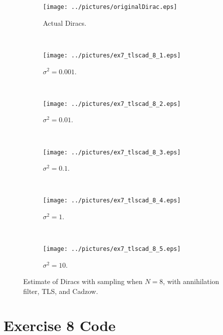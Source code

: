 \documentclass[11pt,a4paper]{report}
\begin{document}
\begin{figure}[H]
    \captionsetup[subfigure]{position=b}
    \centering
    \begin{subfigure}{0.49\textwidth}
        \texttt{[image: ../pictures/originalDirac.eps]}
        \caption{Actual Diracs.}
        \label{fig:ex7_tlscad_8_0}
    \end{subfigure}
    ~
    \begin{subfigure}{0.49\textwidth}
        \texttt{[image: ../pictures/ex7\_tlscad\_8\_1.eps]}
        \caption{$\sigma^2 = 0.001$.}
        \label{fig:ex7_tlscad_8_1}
    \end{subfigure}
    \\
    \begin{subfigure}{0.49\textwidth}
        \texttt{[image: ../pictures/ex7\_tlscad\_8\_2.eps]}
        \caption{$\sigma^2 = 0.01$.}
        \label{fig:ex7_tlscad_8_2}
    \end{subfigure}
    ~
    \begin{subfigure}{0.49\textwidth}
        \texttt{[image: ../pictures/ex7\_tlscad\_8\_3.eps]}
        \caption{$\sigma^2 = 0.1$.}
        \label{fig:ex7_tlscad_8_3}
    \end{subfigure}
    \\
    \begin{subfigure}{0.49\textwidth}
        \texttt{[image: ../pictures/ex7\_tlscad\_8\_4.eps]}
        \caption{$\sigma^2 = 1$.}
        \label{fig:ex7_tlscad_8_4}
    \end{subfigure}
    ~
    \begin{subfigure}{0.49\textwidth}
        \texttt{[image: ../pictures/ex7\_tlscad\_8\_5.eps]}
        \caption{$\sigma^2 = 10$.}
        \label{fig:ex7_tlscad_8_5}
    \end{subfigure}

    \caption{Estimate of Diracs with sampling when $N = 8$, with annihilation filter, TLS, and Cadzow.}
    \label{fig:ex7_tlscad_8}
\end{figure}

\newpage
\section{Exercise 8 Code}
\end{document}
